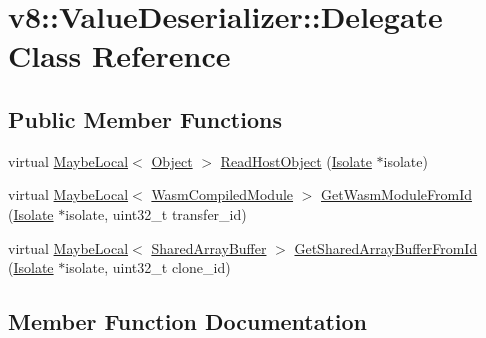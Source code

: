 \hypertarget{classv8_1_1ValueDeserializer_1_1Delegate}{}\section{v8\+:\+:Value\+Deserializer\+:\+:Delegate Class Reference}
\label{classv8_1_1ValueDeserializer_1_1Delegate}
\subsection*{Public Member Functions}
\begin{DoxyCompactItemize}
\item 
virtual \mbox{\hyperlink{classv8_1_1MaybeLocal}{Maybe\+Local}}$<$ \mbox{\hyperlink{classv8_1_1Object}{Object}} $>$ \mbox{\hyperlink{classv8_1_1ValueDeserializer_1_1Delegate_a8b06c19cba7e80c3c5271b0a2ca88a8a}{Read\+Host\+Object}} (\mbox{\hyperlink{classv8_1_1Isolate}{Isolate}} $\ast$isolate)
\item 
virtual \mbox{\hyperlink{classv8_1_1MaybeLocal}{Maybe\+Local}}$<$ \mbox{\hyperlink{classv8_1_1WasmCompiledModule}{Wasm\+Compiled\+Module}} $>$ \mbox{\hyperlink{classv8_1_1ValueDeserializer_1_1Delegate_adcaa80ce590bbcfaac4929a9e7b49249}{Get\+Wasm\+Module\+From\+Id}} (\mbox{\hyperlink{classv8_1_1Isolate}{Isolate}} $\ast$isolate, uint32\+\_\+t transfer\+\_\+id)
\item 
virtual \mbox{\hyperlink{classv8_1_1MaybeLocal}{Maybe\+Local}}$<$ \mbox{\hyperlink{classv8_1_1SharedArrayBuffer}{Shared\+Array\+Buffer}} $>$ \mbox{\hyperlink{classv8_1_1ValueDeserializer_1_1Delegate_a2b42c5b9a4a60bd614e0b343f6be31b5}{Get\+Shared\+Array\+Buffer\+From\+Id}} (\mbox{\hyperlink{classv8_1_1Isolate}{Isolate}} $\ast$isolate, uint32\+\_\+t clone\+\_\+id)
\end{DoxyCompactItemize}


\subsection{Member Function Documentation}
\mbox{\label{classv8_1_1ValueDeserializer_1_1Delegate_a2b42c5b9a4a60bd614e0b343f6be31b5}} 

